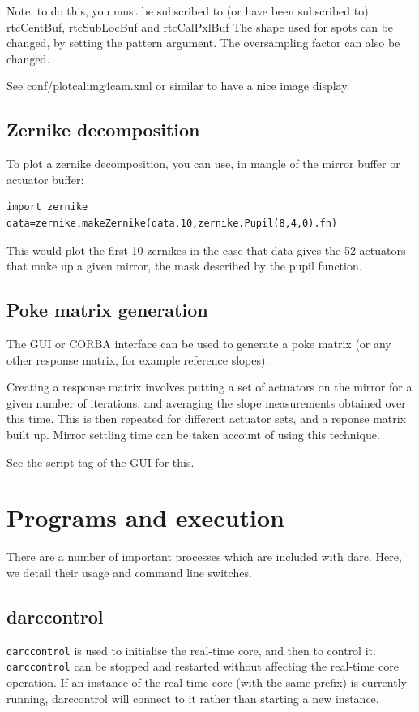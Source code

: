\documentclass[a4,10pt]{article}
\begin{document}
Note, to do this, you must be subscribed to (or have been subscribed
to) rtcCentBuf, rtcSubLocBuf and rtcCalPxlBuf
The shape used for spots can be changed, by setting the pattern
argument.  The oversampling factor can also be changed.

See conf/plotcalimg4cam.xml or similar to have a nice image display.

\subsection{Zernike decomposition}
To plot a zernike decomposition, you can use, in mangle of the mirror
buffer or actuator buffer:
\begin{verbatim}
import zernike
data=zernike.makeZernike(data,10,zernike.Pupil(8,4,0).fn)
\end{verbatim}
This would plot the first 10 zernikes in the case that data
gives the 52 actuators that make up a given mirror, the mask described
by the pupil function.

\subsection{Poke matrix generation}
The GUI or CORBA interface can be used to generate a poke matrix (or
any other response matrix, for example reference slopes).

Creating a response matrix involves putting a set of actuators on the
mirror for a given number of iterations, and averaging the slope
measurements obtained over this time.  This is then repeated for
different actuator sets, and a reponse matrix built up.  Mirror
settling time can be taken account of using this technique.

See the script tag of the GUI for this.

\section{Programs and execution}
There are a number of important processes which are included with
darc.  Here, we detail their usage and command line switches.

\subsection{darccontrol}
{\tt darccontrol} is used to initialise the real-time core, and then
to control it.  {\tt darccontrol} can be stopped and restarted without
affecting the real-time core operation.  If an instance of the
real-time core (with the same prefix) is currently running,
darccontrol will connect to it rather than starting a new instance.
\end{document}
